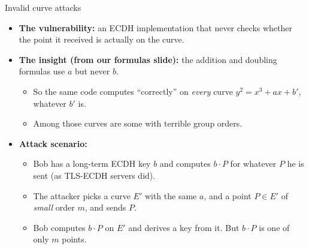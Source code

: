 \ifdefined\PRESENTATION\else\PassOptionsToClass{handout}{beamer}\fi\documentclass[aspectratio=169, lualatex]{beamer}
\begin{document}
\begin{frame}{Invalid curve attacks}
	\begin{itemize}
		\item \textbf{The vulnerability:} an ECDH implementation that never checks whether the point it received is actually on the curve.
		\item \textbf{The insight (from our formulas slide):} the addition and doubling formulas use $a$ but never $b$.
		      \begin{itemize}
			      \item So the same code computes ``correctly'' on \emph{every} curve $y^2 = x^3 + ax + b'$, whatever $b'$ is.
			      \item Among those curves are some with terrible group orders.
		      \end{itemize}
		\item \textbf{Attack scenario:}
		      \begin{itemize}
			      \item Bob has a long-term ECDH key $b$ and computes $b \cdot P$ for whatever $P$ he is sent (as TLS-ECDH servers did).
			      \item The attacker picks a curve $E'$ with the same $a$, and a point $P \in E'$ of \emph{small} order $m$, and sends $P$.
			      \item Bob computes $b \cdot P$ on $E'$ and derives a key from it. But $b \cdot P$ is one of only $m$ points.
		      \end{itemize}
	\end{itemize}
\end{frame}
\end{document}
